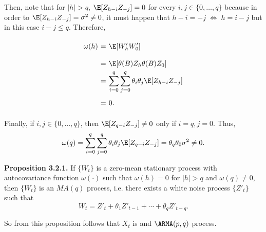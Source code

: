 Then, note that for $|h| > q$, $\E[Z_{h-i}Z_{-j}] = 0$ for every $i,j \in \{0,\ldots, q\}$ because in order to $\E[Z_{h-i}Z_{-j}] = \sigma^2 \neq 0$, it must happen that $h-i = -j \;\iff\; h = i-j$ but in this case $i-j \leq q$. Therefore,
\[ \everymath{\displaystyle}
\arraycolsep=1.8pt\def\arraystretch{2}
\begin{array}{rcl}
    \omega(h) & = & \E[W'_h W'_0]\\
    & = & \E[\theta(B)Z_h \theta(B) Z_0]\\
    & = & \sum_{i = 0}^q \sum_{j = 0}^q \theta_{i} \theta_{j} \E[Z_{h-i}Z_{-j}]\\
    & = & 0.
\end{array} \]

Finally, if $i,j \in \{0,\ldots, q\}$, then $\E[Z_{q-i}Z_{-j}] \neq 0$ only if $i = q, j = 0$. Thus,
\[ \omega(q) = \sum_{i = 0}^q \sum_{j = 0}^q \theta_{i} \theta_{j} \E[Z_{q-i}Z_{-j}] = \theta_{q} \theta_{0} \sigma^2 \neq 0. \]

\textbf{Proposition 3.2.1.} If $\{ W_t \}$ is a zero-mean stationary process with autocovariance function $\omega(\cdot)$ such that $\omega(h) = 0$ for $|h| > q$ and $\omega(q) \neq 0$, then $\{W_t\}$ is an $MA(q)$ process, i.e. there exists a white noise process $\{Z'_t\}$ such that
\[ W_{t}=Z'_{t}+\theta_{1}Z'_{t-1}+\cdots+\theta_{q}Z'_{t-q}. \]

So from this proposition follows that $X_t$ is and $\ARMA(p,q)$ process.

